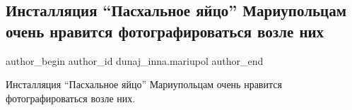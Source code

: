  
 
 
 
 

\subsection{Инсталляция \enquote{Пасхальное яйцо} Мариупольцам очень нравится фотографироваться возле них}
\label{sec:29_04_2019.fb.dunaj_inna.mariupol.1.instaljacia_pashalnoje_jajco}

\ifcmt
 author_begin
   author_id dunaj_inna.mariupol
 author_end
\fi

Инсталляция \enquote{Пасхальное яйцо} Мариупольцам очень нравится фотографироваться возле них.
